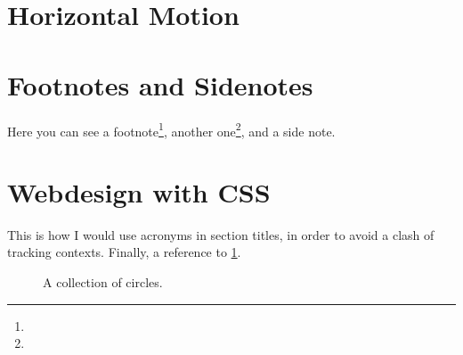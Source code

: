 \documentclass[british]{etsbook}
\begin{document}
\section{Horizontal Motion}
\lipsum[3-5]

\section{Footnotes and Sidenotes}

Here you can see a footnote\footnote{\lipsum[1][1-3]}, another
one\footnote{\lipsum[1][4-5]}, and a side note.\marginline{\small
  \lipsum[1][5-7]} \lipsum[2-5]

\section[Webdesign with \acr{CSS}]{Webdesign with CSS}

This is how I would use acronyms in section titles, in order to avoid a clash of
tracking contexts.  Finally, a reference to \cref{fig:circles}.

\begin{figure}
  \centering
  
  \caption{A collection of circles. \lipsum[1][1-3]}\label{fig:circles}
\end{figure}
\end{document}
